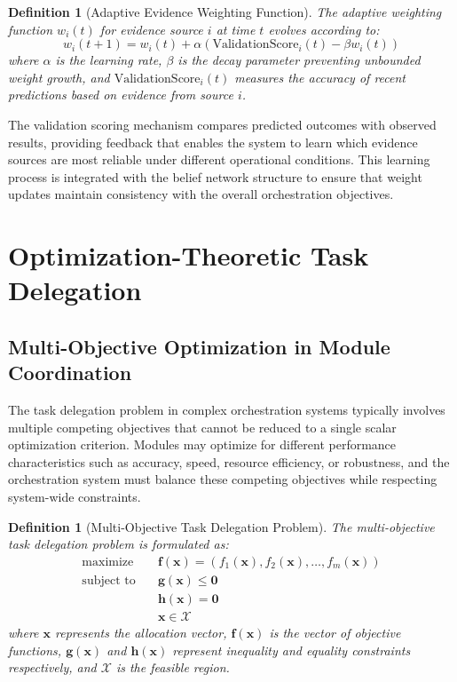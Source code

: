 \documentclass[12pt,a4paper]{article}
\newtheorem{definition}[theorem]{Definition}
\begin{document}
\begin{definition}[Adaptive Evidence Weighting Function]
The adaptive weighting function $w_i(t)$ for evidence source $i$ at time $t$ evolves according to:
\begin{equation}
w_i(t+1) = w_i(t) + \alpha \left( \text{ValidationScore}_i(t) - \beta w_i(t) \right)
\end{equation}
where $\alpha$ is the learning rate, $\beta$ is the decay parameter preventing unbounded weight growth, and $\text{ValidationScore}_i(t)$ measures the accuracy of recent predictions based on evidence from source $i$.
\end{definition}

The validation scoring mechanism compares predicted outcomes with observed results, providing feedback that enables the system to learn which evidence sources are most reliable under different operational conditions. This learning process is integrated with the belief network structure to ensure that weight updates maintain consistency with the overall orchestration objectives.

\section{Optimization-Theoretic Task Delegation}

\subsection{Multi-Objective Optimization in Module Coordination}

The task delegation problem in complex orchestration systems typically involves multiple competing objectives that cannot be reduced to a single scalar optimization criterion. Modules may optimize for different performance characteristics such as accuracy, speed, resource efficiency, or robustness, and the orchestration system must balance these competing objectives while respecting system-wide constraints.

\begin{definition}[Multi-Objective Task Delegation Problem]
The multi-objective task delegation problem is formulated as:
\begin{align}
\text{maximize} \quad &\mathbf{f}(\mathbf{x}) = (f_1(\mathbf{x}), f_2(\mathbf{x}), \ldots, f_m(\mathbf{x})) \\
\text{subject to} \quad &\mathbf{g}(\mathbf{x}) \leq \mathbf{0} \\
&\mathbf{h}(\mathbf{x}) = \mathbf{0} \\
&\mathbf{x} \in \mathcal{X}
\end{align}
where $\mathbf{x}$ represents the allocation vector, $\mathbf{f}(\mathbf{x})$ is the vector of objective functions, $\mathbf{g}(\mathbf{x})$ and $\mathbf{h}(\mathbf{x})$ represent inequality and equality constraints respectively, and $\mathcal{X}$ is the feasible region.
\end{definition}
\end{document}
